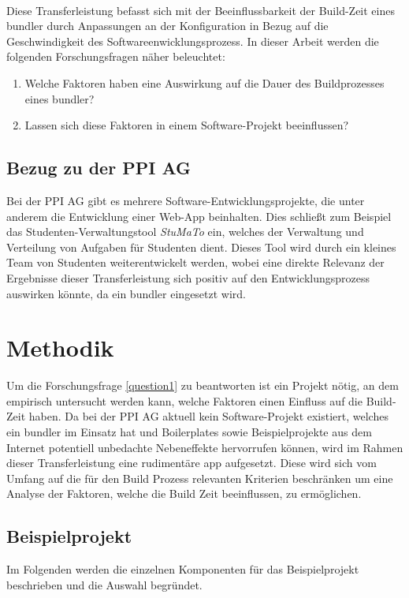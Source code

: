 \documentclass[11pt]{report}
\begin{document}
		\\
    	Diese Transferleistung befasst sich mit der Beeinflussbarkeit der Build-Zeit eines \Gls{bundler} durch Anpassungen an der Konfiguration in Bezug auf die Geschwindigkeit des Softwareenwicklungsprozess. In dieser Arbeit werden die folgenden Forschungsfragen näher beleuchtet:
	    	\begin{enumerate}
		    	\item Welche Faktoren haben eine Auswirkung auf die Dauer des Buildprozesses eines \Gls{bundler}? \label{question1}
		    	\item Lassen sich diese Faktoren in einem Software-Projekt beeinflussen? \label{question2}
		    \end{enumerate}

		\section{Bezug zu der PPI AG}
			Bei der PPI AG gibt es mehrere Software-Entwicklungsprojekte, die unter anderem die Entwicklung einer Web-App beinhalten. Dies schließt zum Beispiel das Studenten-Verwaltungstool \emph{StuMaTo} ein, welches der Verwaltung und Verteilung von Aufgaben für Studenten dient. Dieses Tool wird durch ein kleines Team von Studenten weiterentwickelt werden, wobei eine direkte Relevanz der Ergebnisse dieser Transferleistung sich positiv auf den Entwicklungsprozess auswirken könnte, da ein \Gls{bundler} eingesetzt wird.

	\chapter{Methodik}
		\label{section:method}
		Um die Forschungsfrage \ref{question1} zu beantworten ist ein Projekt nötig, an dem empirisch untersucht werden kann, welche Faktoren einen Einfluss auf die Build-Zeit haben. Da bei der PPI AG aktuell kein Software-Projekt existiert, welches ein \Gls{bundler} im Einsatz hat und Boilerplates sowie Beispielprojekte aus dem Internet potentiell unbedachte Nebeneffekte hervorrufen können, wird im Rahmen dieser Transferleistung eine rudimentäre \Gls{app} aufgesetzt. Diese wird sich vom Umfang auf die für den Build Prozess relevanten Kriterien beschränken um eine Analyse der Faktoren, welche die Build Zeit beeinflussen, zu ermöglichen.
		\section{Beispielprojekt}
			Im Folgenden werden die einzelnen Komponenten für das Beispielprojekt beschrieben und die Auswahl begründet.
\end{document}
